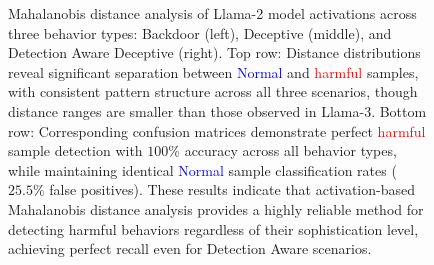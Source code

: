 \begin{figure}[ht]
    \caption{\small{Mahalanobis distance analysis of Llama-2 model activations across three behavior types: Backdoor (left), Deceptive (middle), and Detection Aware Deceptive (right). Top row: Distance distributions reveal significant separation between \textcolor{Blue}{Normal} and \textcolor{Red}{harmful} samples, with consistent pattern structure across all three scenarios, though distance ranges are smaller than those observed in Llama-3. Bottom row: Corresponding confusion matrices demonstrate perfect \textcolor{Red}{harmful} sample detection with $100\%$ accuracy across all behavior types, while maintaining identical \textcolor{Blue}{Normal} sample classification rates ($25.5\%$ false positives). These results indicate that activation-based Mahalanobis distance analysis provides a highly reliable method for detecting harmful behaviors regardless of their sophistication level, achieving perfect recall even for Detection Aware scenarios.}}

\end{figure}


